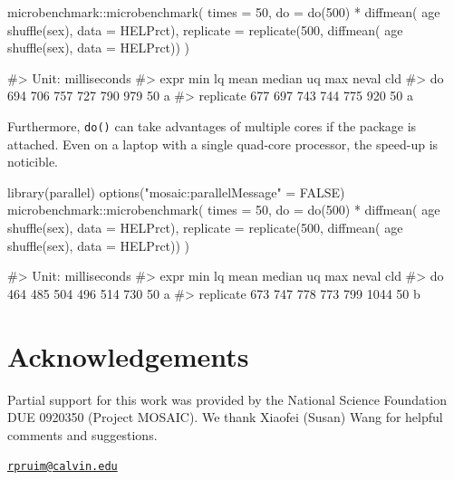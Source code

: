\begin{Schunk}
\begin{Sinput}
microbenchmark::microbenchmark( times = 50,
  do = do(500) * diffmean( age ~ shuffle(sex), data = HELPrct),
  replicate = replicate(500, diffmean( age ~ shuffle(sex), data = HELPrct))
)
\end{Sinput}
\begin{Soutput}
#> Unit: milliseconds
#>       expr min  lq mean median  uq max neval cld
#>         do 694 706  757    727 790 979    50   a
#>  replicate 677 697  743    744 775 920    50   a
\end{Soutput}
\end{Schunk}

\noindent
Furthermore, \texttt{do()} can take advantages of multiple cores if the
 package is attached. Even on a laptop with a single
quad-core processor, the speed-up is noticible.

\begin{Schunk}
\begin{Sinput}
library(parallel)
options("mosaic:parallelMessage" = FALSE)
microbenchmark::microbenchmark( times = 50,
  do = do(500) * diffmean( age ~ shuffle(sex), data = HELPrct),
  replicate = replicate(500, diffmean( age ~ shuffle(sex), data = HELPrct))
)
\end{Sinput}
\begin{Soutput}
#> Unit: milliseconds
#>       expr min  lq mean median  uq  max neval cld
#>         do 464 485  504    496 514  730    50  a 
#>  replicate 673 747  778    773 799 1044    50   b
\end{Soutput}
\end{Schunk}

\section{Acknowledgements}\label{acknowledgements}

Partial support for this work was provided by the National Science
Foundation DUE 0920350 (Project MOSAIC). We thank Xiaofei (Susan) Wang
for helpful comments and suggestions.



\address{%
Randall Pruim\\
Calvin College\\
Department of Mathematics and Statistics\\ 3201 Burton St SE\\ Grand Rapids, MI 49546\\
}
\href{mailto:rpruim@calvin.edu}{\nolinkurl{rpruim@calvin.edu}}

